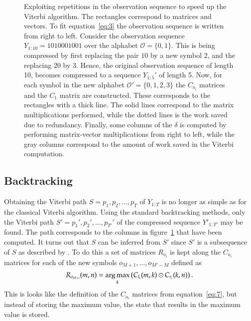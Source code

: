 \begin{figure}
  \centering
  
  \caption{Exploiting repetitions in the observation sequence to speed up the
    Viterbi algorithm. The rectangles correspond to matrices and vectors. To
    fit equation~\eqref{eq:3} the observation sequence is written from right to
    left. Consider the observation sequence $Y_{1:10} = 1010001001$ over the
    alphabet $\mathcal{O} = \{0, 1\}$. This is being compressed by first
    replacing the pair $10$ by a new symbol $2$, and the replacing $20$ by $3$.
    Hence, the original observation sequence of length 10, becomes compressed
    to a sequence $Y_{1:5}'$ of length 5. Now, for each symbol in the new
    alphabet $\mathcal{O'} = \{0, 1, 2, 3\}$ the $C_{o_i}$ matrices and the
    $C_1$ matrix are constructed. These corresponds to the rectangles with a
    thick line. The solid lines correspond to the matrix multiplications
    performed, while the dotted lines is the work saved due to redundancy.
    Finally, some columns of the $\delta$ is computed by performing
    matrix-vector multiplications from right to left, while the gray columns
    correspond to the amount of work saved in the Viterbi computation.}
  \label{fig:exploiting-repetitions}
\end{figure}

\subsection{Backtracking}
\label{sec:backtracking}

Obtaining the Viterbi path $S = p_1, p_2, \dots, p_T$ of $Y_{1:T}$ is no longer
as simple as for the classical Viterbi algorithm. Using the standard
backtracking methods, only the Viterbi path $S' = p_1', p_2', \dots, p_{T'}'$
of the compressed sequence $Y'_{1:T'}$ may be found. The path corresponds to
the columns in figure~\ref{fig:exploiting-repetitions} that have been
computed. It turns out that $S$ can be inferred from $S'$ since $S'$
is a subsequence of $S$ as described by \citet{lifshits2009speeding}. To do
this a set of matrices $R_{o_i}$ is kept along the $C_{o_i}$ matrices for each
of the new symbols $o_{M + 1}, \dots, o_{M' - M}$ defined as
\begin{equation*}
  R_{o_{M + i}}(m, n) = \operatorname*{arg\,max}_k
  \left(
    C_{l_i}(m, k) \odot C_{r_i}(k, n)
  \right).
\end{equation*}
This is looks like the definition of the $C_{o_i}$ matrices from
equation~\eqref{eq:7}, but instead of storing the maximum value, the state that
results in the maximum value is stored.

